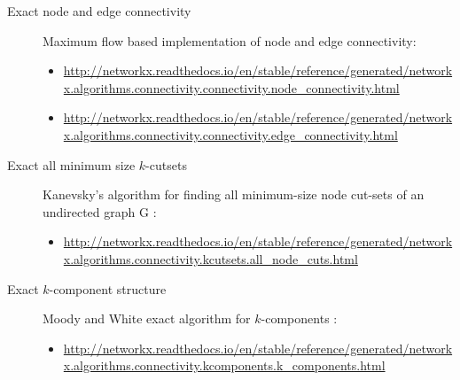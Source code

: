 \begin{description}

\item[Exact node and edge connectivity] Maximum flow based implementation of node and edge connectivity:

\begin{scriptsize} 
\begin{itemize} 

\item \href{http://networkx.readthedocs.io/en/stable/reference/generated/networkx.algorithms.connectivity.connectivity.node_connectivity.html}{http://networkx.readthedocs.io/en/stable/reference/generated/networkx.algorithms.connectivity.connectivity.node\_connectivity.html}

\item \href{http://networkx.readthedocs.io/en/stable/reference/generated/networkx.algorithms.connectivity.connectivity.edge_connectivity.html}{http://networkx.readthedocs.io/en/stable/reference/generated/networkx.algorithms.connectivity.connectivity.edge\_connectivity.html}

\end{itemize}
\end{scriptsize}

\item[Exact all minimum size $k$-cutsets]  Kanevsky's algorithm for finding all minimum-size node cut-sets of an undirected graph G \citep{kanevsky:1993}:

\begin{scriptsize} 
\begin{itemize} 

\item \href{http://networkx.readthedocs.io/en/stable/reference/generated/networkx.algorithms.connectivity.kcutsets.all_node_cuts.html}{http://networkx.readthedocs.io/en/stable/reference/generated/networkx.algorithms.connectivity.kcutsets.all\_node\_cuts.html}

\end{itemize}
\end{scriptsize}

\item[Exact $k$-component structure] Moody and White exact algorithm for $k$-components \citep{moody:2003}:

\begin{scriptsize} 
\begin{itemize}

\item \href{http://networkx.readthedocs.io/en/stable/reference/generated/networkx.algorithms.connectivity.kcomponents.k_components.html}{http://networkx.readthedocs.io/en/stable/reference/generated/networkx.algorithms.connectivity.kcomponents.k\_components.html}


\end{itemize}
\end{scriptsize}
\end{description}
